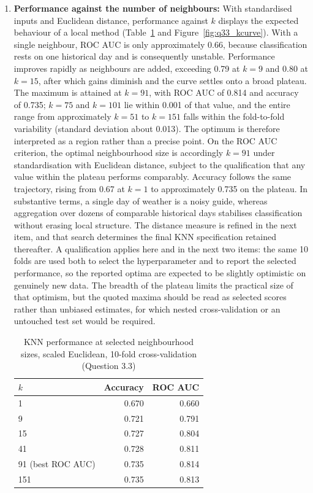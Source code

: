 \documentclass[conference]{IEEEtran}
\begin{document}
\begin{enumerate}
    \item \textbf{Performance against the number of neighbours:} With standardised inputs and Euclidean distance, performance against $k$ displays the expected behaviour of a local method (Table~\ref{tab:knnk} and Figure~\ref{fig:q33_kcurve}). With a single neighbour, ROC AUC is only approximately 0.66, because classification rests on one historical day and is consequently unstable. Performance improves rapidly as neighbours are added, exceeding 0.79 at $k = 9$ and 0.80 at $k = 15$, after which gains diminish and the curve settles onto a broad plateau. The maximum is attained at $k = 91$, with ROC AUC of 0.814 and accuracy of 0.735; $k = 75$ and $k = 101$ lie within 0.001 of that value, and the entire range from approximately $k = 51$ to $k = 151$ falls within the fold-to-fold variability (standard deviation about 0.013). The optimum is therefore interpreted as a region rather than a precise point. On the ROC AUC criterion, the optimal neighbourhood size is accordingly $k = 91$ under standardisation with Euclidean distance, subject to the qualification that any value within the plateau performs comparably. Accuracy follows the same trajectory, rising from 0.67 at $k = 1$ to approximately 0.735 on the plateau. In substantive terms, a single day of weather is a noisy guide, whereas aggregation over dozens of comparable historical days stabilises classification without erasing local structure. The distance measure is refined in the next item, and that search determines the final KNN specification retained thereafter. A qualification applies here and in the next two items: the same 10 folds are used both to select the hyperparameter and to report the selected performance, so the reported optima are expected to be slightly optimistic on genuinely new data. The breadth of the plateau limits the practical size of that optimism, but the quoted maxima should be read as selected scores rather than unbiased estimates, for which nested cross-validation or an untouched test set would be required.

    \begin{table}[h!]
        \centering
        \footnotesize
        \begin{tabular}{lrr}
            \toprule
            $k$ & Accuracy & ROC AUC \\
            \midrule
            1 & 0.670 & 0.660 \\
            9 & 0.721 & 0.791 \\
            15 & 0.727 & 0.804 \\
            41 & 0.728 & 0.811 \\
            91 (best ROC AUC) & 0.735 & 0.814 \\
            151 & 0.735 & 0.813 \\
            \bottomrule
        \end{tabular}
        \caption{KNN performance at selected neighbourhood sizes, scaled Euclidean, 10-fold cross-validation (Question 3.3)}
        \label{tab:knnk}
    \end{table}


\end{enumerate}
\end{document}
